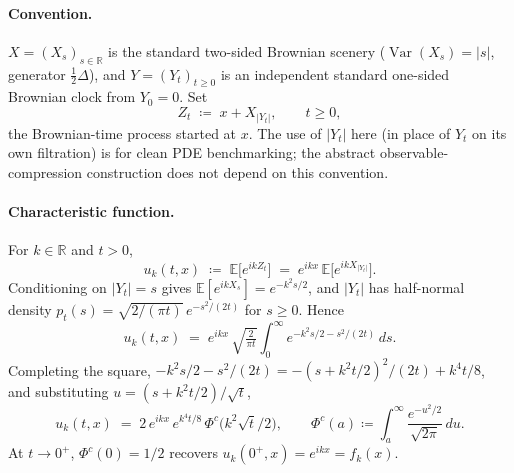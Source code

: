 \documentclass[11pt,reqno]{amsart}
\theoremstyle{plain}
\theoremstyle{definition}
\theoremstyle{remark}
\newcommand{\R}{\mathbb{R}}
\newcommand{\E}{\mathbb{E}}
\DeclareMathOperator{\Var}{Var}
\begin{document}
\paragraph{Convention.} $X=(X_s)_{s\in\R}$ is the standard two-sided
Brownian scenery ($\Var(X_s)=|s|$, generator $\tfrac12\Delta$), and
$Y=(Y_t)_{t\ge 0}$ is an independent standard one-sided Brownian clock
from $Y_0=0$. Set
\[
  Z_t\;\coloneqq\;x+X_{|Y_t|},\qquad t\ge 0,
\]
the Brownian-time process started at $x$. The use of $|Y_t|$ here (in
place of $Y_t$ on its own filtration) is for clean PDE benchmarking;
the abstract observable-compression construction does not depend on
this convention.

\paragraph{Characteristic function.}
For $k\in\R$ and $t>0$,
\[
  u_k(t,x)\;\coloneqq\;\E\bigl[e^{ikZ_t}\bigr]
  \;=\;e^{ikx}\,\E\bigl[e^{ikX_{|Y_t|}}\bigr].
\]
Conditioning on $|Y_t|=s$ gives $\E[e^{ikX_s}]=e^{-k^{2}s/2}$, and
$|Y_t|$ has half-normal density
$p_t(s)=\sqrt{2/(\pi t)}\,e^{-s^{2}/(2t)}$ for $s\ge 0$. Hence
\begin{equation}\label{eq:uk-int}
  u_k(t,x)
  \;=\;e^{ikx}\,\sqrt{\tfrac{2}{\pi t}}
   \int_0^\infty e^{-k^{2}s/2-s^{2}/(2t)}\,ds.
\end{equation}
Completing the square,
$-k^{2}s/2-s^{2}/(2t)=-(s+k^{2}t/2)^{2}/(2t)+k^{4}t/8$, and
substituting $u=(s+k^{2}t/2)/\sqrt{t}$,
\begin{equation}\label{eq:uk-closed}
  u_k(t,x)
  \;=\;2\,e^{ikx}\,e^{k^{4}t/8}\,\Phi^{c}\!\bigl(k^{2}\sqrt{t}/2\bigr),
  \qquad
  \Phi^{c}(a)\coloneqq\!\int_a^\infty\!\frac{e^{-u^{2}/2}}{\sqrt{2\pi}}\,du.
\end{equation}
At $t\to 0^{+}$, $\Phi^{c}(0)=1/2$ recovers $u_k(0^{+},x)=e^{ikx}=f_k(x)$.
\end{document}
